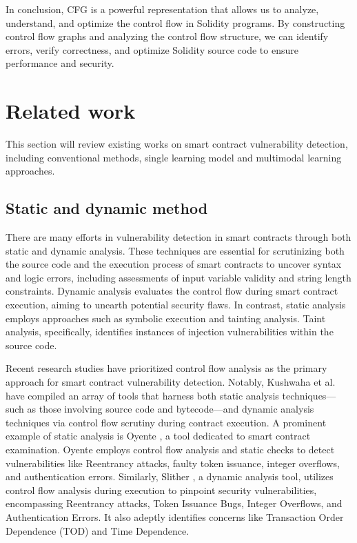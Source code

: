 In conclusion, CFG is a powerful representation that allows us to analyze, understand, and optimize the control flow in Solidity programs. By constructing control flow graphs and analyzing the control flow structure, we can identify errors, verify correctness, and optimize Solidity source code to ensure performance and security.

\section{Related work} \label{related_work}

This section will review existing works on smart contract vulnerability detection, including conventional methods, single learning model and multimodal learning approaches.

\subsection{Static and dynamic method} 

There are many efforts in vulnerability detection in smart contracts through both static and dynamic analysis. These techniques are essential for scrutinizing both the source code and the execution process of smart contracts to uncover syntax and logic errors, including assessments of input variable validity and string length constraints. Dynamic analysis evaluates the control flow during smart contract execution, aiming to unearth potential security flaws. In contrast, static analysis employs approaches such as symbolic execution and tainting analysis. Taint analysis, specifically, identifies instances of injection vulnerabilities within the source code.

Recent research studies have prioritized control flow analysis as the primary approach for smart contract vulnerability detection. Notably, Kushwaha et al. \cite{Tool_review_SC} have compiled an array of tools that harness both static analysis techniques—such as those involving source code and bytecode—and dynamic analysis techniques via control flow scrutiny during contract execution. A prominent example of static analysis is Oyente \cite{oyente}, a tool dedicated to smart contract examination. Oyente employs control flow analysis and static checks to detect vulnerabilities like Reentrancy attacks, faulty token issuance, integer overflows, and authentication errors. Similarly, Slither \cite{slither}, a dynamic analysis tool, utilizes control flow analysis during execution to pinpoint security vulnerabilities, encompassing Reentrancy attacks, Token Issuance Bugs, Integer Overflows, and Authentication Errors. It also adeptly identifies concerns like Transaction Order Dependence (TOD) and Time Dependence.

